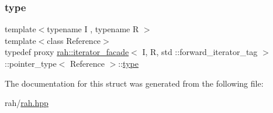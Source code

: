 \subsubsection{\texorpdfstring{type}{type}}
{\footnotesize\ttfamily template$<$typename I , typename R $>$ \\
template$<$class Reference$>$ \\
typedef proxy \mbox{\hyperlink{structrah_1_1iterator__facade}{rah\+::iterator\+\_\+facade}}$<$ I, R, std \+::forward\+\_\+iterator\+\_\+tag $>$\+::pointer\+\_\+type$<$ Reference $>$\+::\mbox{\hyperlink{structrah_1_1iterator__facade_3_01_i_00_01_r_00_01std_01_1_1forward__iterator__tag_01_4_1_1pointer__type_a6dfc5e7e50df83f855dd5e3478f122a5}{type}}}



The documentation for this struct was generated from the following file\+:\begin{DoxyCompactItemize}
\item 
rah/\mbox{\hyperlink{rah_8hpp}{rah.\+hpp}}\end{DoxyCompactItemize}
